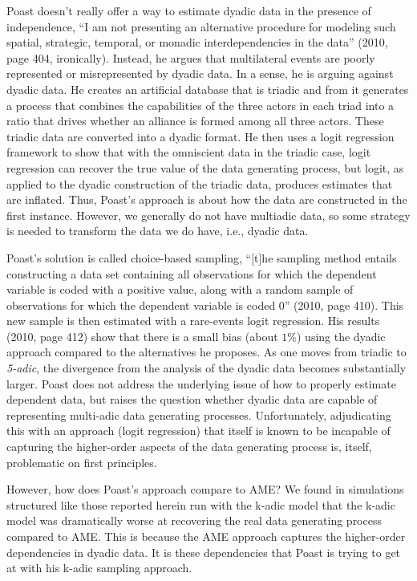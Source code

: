 Poast \citeyear{poast:2010,poast:2016} doesn't really offer a way to estimate dyadic data in the presence of independence,
``I am not presenting an alternative procedure for modeling such spatial, strategic, temporal,
or monadic interdependencies in the data'' (2010, page 404, ironically). Instead, he argues that multilateral events are poorly represented or misrepresented by dyadic data.  In a sense, he is arguing against dyadic data.  He creates an artificial database that is triadic and from it generates a process that combines the capabilities of the three actors in each triad into a ratio that drives whether an alliance is formed among all three actors.  These triadic data are converted into a dyadic format. He then uses a logit regression framework to show that with the omniscient data in the triadic case, logit regression can recover the true value of the data generating process, but logit, as applied to the dyadic construction of the triadic data, produces estimates that are inflated. Thus, Poast's approach is about how the data are constructed in the first instance. However, we generally do not have multiadic data, so some strategy is needed to transform the data we do have, i.e., dyadic data.

Poast's solution is called choice-based sampling, ``[t]he sampling method entails constructing a data set containing all observations for which the dependent variable is coded with a positive value, along with a random sample of observations for which the dependent variable is coded 0'' (2010, page 410). This new sample is then estimated with a rare-events logit regression. His results (2010, page 412) show that there is a small bias (about $1\%$) using the dyadic approach compared to the alternatives he proposes.  As one moves from triadic to \textit{5-adic}, the divergence from the analysis of the dyadic data becomes substantially larger. Poast does not address the underlying issue of how to properly estimate dependent data, but raises the question whether dyadic data are capable of representing multi-adic data generating processes.  Unfortunately, adjudicating this with an approach (logit regression) that itself is known to be incapable of capturing the higher-order aspects of the data generating process is, itself, problematic on first principles.  

However, how does Poast's approach compare to AME? We found in simulations structured like those reported herein run with the k-adic model that the k-adic model was dramatically worse at recovering the real data generating process compared to AME. This is because the AME approach captures the higher-order dependencies in dyadic data. It is these dependencies that Poast is trying to get at with his k-adic sampling approach. 


